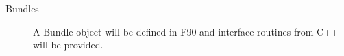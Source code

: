 

\begin{description}

\item [Bundles] A Bundle object will be defined in F90 and interface
routines from C++ will be provided.

\end{description}





